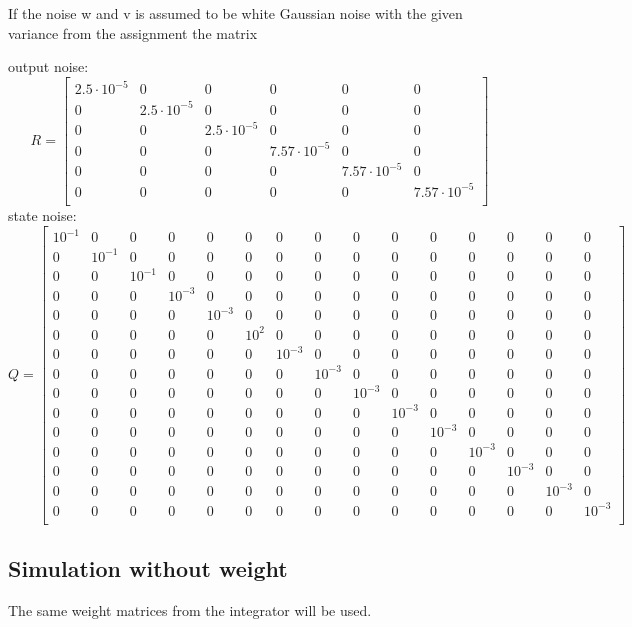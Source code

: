 If the noise w and v is assumed to be white Gaussian noise with the given variance from the assignment the matrix

output noise:
$$
R=\begin{bmatrix}
2.5 \cdot 10^{-5} & 0 & 0 & 0 & 0 & 0 \\
0 & 2.5 \cdot 10^{-5} & 0 & 0 & 0 & 0 \\
0 & 0 & 2.5 \cdot 10^{-5} & 0 & 0 & 0 \\
0 & 0 & 0 & 7.57 \cdot 10^{-5} & 0 & 0 \\
0 & 0 & 0 & 0 & 7.57 \cdot 10^{-5} & 0 \\
0 & 0 & 0 & 0 & 0 & 7.57 \cdot 10^{-5} \\
\end{bmatrix}
$$
state noise:
$$
Q=\begin{bmatrix}
10^{-1} & 0 & 0 & 0 & 0 & 0 & 0 & 0 & 0 & 0 & 0 & 0 & 0 & 0 & 0 \\
0 & 10^{-1} & 0 & 0 & 0 & 0 & 0 & 0 & 0 & 0 & 0 & 0 & 0 & 0 & 0 \\
0 & 0 & 10^{-1} & 0 & 0 & 0 & 0 & 0 & 0 & 0 & 0 & 0 & 0 & 0 & 0 \\
0 & 0 & 0 & 10^{-3} & 0 & 0 & 0 & 0 & 0 & 0 & 0 & 0 & 0 & 0 & 0 \\
0 & 0 & 0 & 0 & 10^{-3} & 0 & 0 & 0 & 0 & 0 & 0 & 0 & 0 & 0 & 0 \\
0 & 0 & 0 & 0 & 0 & 10^2 & 0 & 0 & 0 & 0 & 0 & 0 & 0 & 0 & 0 \\
0 & 0 & 0 & 0 & 0 & 0 & 10^{-3} & 0 & 0 & 0 & 0 & 0 & 0 & 0 & 0 \\
0 & 0 & 0 & 0 & 0 & 0 & 0 & 10^{-3} & 0 & 0 & 0 & 0 & 0 & 0 & 0 \\
0 & 0 & 0 & 0 & 0 & 0 & 0 & 0 & 10^{-3} & 0 & 0 & 0 & 0 & 0 & 0 \\
0 & 0 & 0 & 0 & 0 & 0 & 0 & 0 & 0 & 10^{-3} & 0 & 0 & 0 & 0 & 0 \\
0 & 0 & 0 & 0 & 0 & 0 & 0 & 0 & 0 & 0 & 10^{-3} & 0 & 0 & 0 & 0 \\
0 & 0 & 0 & 0 & 0 & 0 & 0 & 0 & 0 & 0 & 0 & 10^{-3} & 0 & 0 & 0 \\
0 & 0 & 0 & 0 & 0 & 0 & 0 & 0 & 0 & 0 & 0 & 0 & 10^{-3} & 0 & 0 \\
0 & 0 & 0 & 0 & 0 & 0 & 0 & 0 & 0 & 0 & 0 & 0 & 0 & 10^{-3} & 0 \\
0 & 0 & 0 & 0 & 0 & 0 & 0 & 0 & 0 & 0 & 0 & 0 & 0 & 0 & 10^{-3} \\
\end{bmatrix}
$$

\subsection{Simulation without weight}
The same weight matrices from the integrator will be used.

